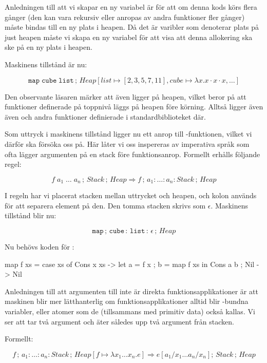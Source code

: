 \documentclass[../Core]{subfiles}
\begin{document}
Anledningen till att vi skapar en ny variabel  är för att om
denna kods körs flera gånger (den kan vara rekursiv eller anropas av andra funktioner
fler gånger) måste  bindas till en ny plats i heapen. Då det är varibler som
denoterar plats på just heapen måste vi skapa en ny variabel för att visa att denna
allokering ska ske på en ny plats i heapen.

Maskinens tillstånd är nu:

\[
\mathtt{map\; cube\; list}\,;\, Heap[list\mapsto[2,3,5,7,11],cube\mapsto\lambda x.x\cdot x\cdot x,\ldots]\]


Den observante läsaren märker att även  ligger på heapen, vilket
beror på att funktioner definerade på toppnivå läggs på heapen före körning.
Alltså ligger även även  och andra funktioner definierade
i standardbiblioteket där.

Som uttryck i maskinens tillstånd ligger nu ett anrop till
-funktionen, vilket vi därför ska försöka oss på.
Här låter vi oss inspereras av imperativa språk som ofta lägger argumenten
på en stack före funktionsanrop. Formellt erhålls följande regel:

\[
f\; a_{1}\;\ldots\; a_{n}\,;\, Stack\,;\, Heap\Rightarrow f\,;\, a_{1}:\ldots:a_{n}:Stack\,;\, Heap\]


I regeln har vi placerat stacken mellan uttrycket och heapen, och kolon används
för att separera element på den. Den tomma stacken skrivs som $\epsilon$.
Maskinens tillstånd blir nu:

\[
\mathtt{map\,\mathrm{;}\, cube\,:\, list\,:\,\epsilon}\,;\, Heap\]


Nu behövs koden för :


\begin{codeEx}
map f xs = case xs of
    { Cons x xs -> let { a = f x
                       ; b = map f xs
                       } in Cons a b
    ; Nil       -> Nil
    }
\end{codeEx}

Anledningen till att argumenten till  inte är direkta funktionsapplikationer
är att maskinen blir mer lätthanterlig om funktionsapplikationer alltid
blir -bundna variabler, eller atomer som de (tillsammans med primitiv data)
också kallas. Vi ser att  tar två argument och äter således upp två
argument från stacken.

Formellt:

\[
f\,;\, a_{1}:\ldots:a_{n}:Stack\,;\, Heap[f\mapsto\lambda x_{1}\ldots x_{n}.e]\Rightarrow e[a{}_{1}/x_{1}\ldots a_{n}/x_{n}];\, Stack\,;\, Heap\]
\end{document}

